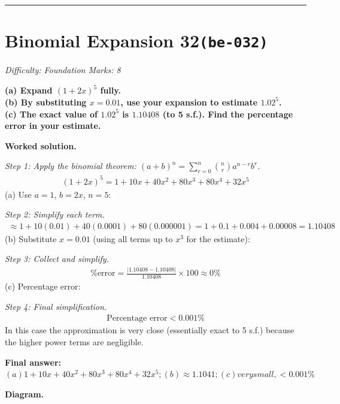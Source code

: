\documentclass[11pt]{article}
\newcommand{\question}[1]{\par\medskip\noindent\textbf{#1}\par}
\begin{document}
\medskip\hrule

\section*{Binomial Expansion 32\quad\small\texttt{(be-032)}}
\textit{Difficulty: Foundation \quad\textbar\quad Marks: 8}

\question{(a) Expand \( (1 + 2x)^5 \) fully. \\[3pt] (b) By substituting \( x = 0.01 \), use your expansion to estimate \( 1.02^5 \). \\[3pt] (c) The exact value of \( 1.02^5 \) is \( 1.10408 \) (to 5 s.f.). Find the percentage error in your estimate.}

\textbf{Worked solution.}

\textit{Step 1: Apply the binomial theorem: \((a+b)^n = \sum_{r=0}^{n} \binom{n}{r} a^{n-r} b^r\).}
\[\begin{gathered}
(1+2x)^5 = 1 + 10x + 40x^2 + 80x^3 + 80x^4 + 32x^5
\end{gathered}\]
(a) Use \(a=1\), \(b=2x\), \(n=5\):

\textit{Step 2: Simplify each term.}
\[\begin{gathered}
\approx 1 + 10(0.01) + 40(0.0001) + 80(0.000001) = 1 + 0.1 + 0.004 + 0.00008 = 1.10408
\end{gathered}\]
(b) Substitute \(x = 0.01\) (using all terms up to \(x^3\) for the estimate):

\textit{Step 3: Collect and simplify.}
\[\begin{gathered}
\text{\% error} = \frac{|1.10408 - 1.10408|}{1.10408} \times 100 \approx 0\%
\end{gathered}\]
(c) Percentage error:

\textit{Step 4: Final simplification.}
\[\begin{gathered}
\text{Percentage error} < 0.001\%
\end{gathered}\]
In this case the approximation is very close (essentially exact to 5 s.f.) because the higher power terms are negligible.

\begin{answerbox}
\textbf{Final answer:}\quad \(\displaystyle (a) 1 + 10x + 40x^2 + 80x^3 + 80x^4 + 32x^5; (b) \approx 1.1041; (c) very small, < 0.001\%\)
\end{answerbox}
\textbf{Diagram.}
\end{document}
